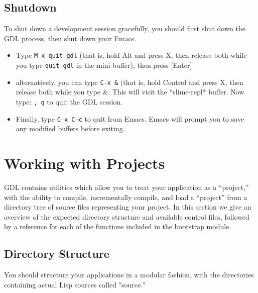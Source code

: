 \documentclass [11pt]{book}
\begin{document}
\subsection{Shutdown}

\label{subsec:shutdown}

 To shut down a development session gracefully, you should first shut down the GDL process,
then shut down your Emacs.

\begin{itemize}

\item Type \texttt{M-x quit-gdl} (that is, hold Alt and press X, then release both while you type \texttt{quit-gdl} in the mini-buffer), then press [Enter]

\item alternatively, you can type \texttt{C-x \&} (that is, hold Control and press X, then release both while you type \&. 
This will visit the *slime-repl* buffer. Now type: \texttt{, q} to quit the GDL session.

\item Finally, type \texttt{C-x C-c} to quit from Emacs. Emacs will prompt you to save any
	   modified buffers before exiting.

\end{itemize}



\section{Working with Projects}

\label{sec:workingwithprojects}

GDL contains utilities which allow you to treat your
application as a ``project,'' with the ability to compile,
incrementally compile, and load a ``project'' from a directory tree of
source files representing your project. In this section we give an
overview of the expected directory structure and available control
files, followed by a reference for each of the functions included in
the bootstrap module.

\subsection{Directory Structure}

\label{subsec:directorystructure}



You should structure your applications in a modular fashion, with the
directories containing actual Lisp sources called "source."
\end{document}

